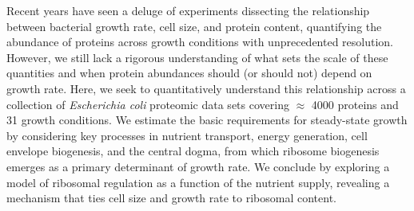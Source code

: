 Recent years have seen a deluge of experiments dissecting the relationship
between bacterial growth rate, cell size, and protein content, quantifying the
abundance of proteins across growth conditions with unprecedented
resolution. However, we still lack a rigorous understanding of what sets the
scale of these quantities and when protein abundances should (or should not)
depend on growth rate. Here, we seek to quantitatively understand this
relationship across a collection of
\textit{Escherichia coli} proteomic data sets covering $\approx$ 4000 proteins
and 31 growth conditions. We estimate the basic requirements for steady-state
growth by considering key processes in nutrient transport, energy generation, cell envelope
biogenesis, and the central dogma, from which ribosome biogenesis
emerges as a primary determinant of growth rate. We conclude by exploring a
model of ribosomal regulation as a function of the nutrient supply, revealing a
mechanism that ties cell size and growth rate to ribosomal content.
